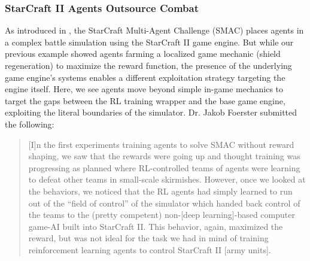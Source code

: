 \subsubsection{StarCraft II Agents Outsource Combat~\citep{samvelyan2019starcraftmultiagentchallenge}}
\label{sec:smachandoff}

As introduced in , the StarCraft Multi-Agent Challenge (SMAC) places agents in a complex battle simulation using the StarCraft II game engine. 
But while our previous example showed agents farming a localized game mechanic (shield regeneration) to maximize the reward function, the presence of the underlying game engine's systems enables a different exploitation strategy targeting the engine itself. Here, we see agents move beyond simple in-game mechanics to target the gaps between the RL training wrapper and the base game engine, exploiting the literal boundaries of the simulator.
Dr. Jakob Foerster submitted the following:

\begin{quote}

[I]n the first experiments training agents to solve SMAC without reward shaping, we saw that the rewards were going up and thought training was progressing as planned where RL-controlled teams of agents were learning to defeat other teams in small-scale skirmishes. 
However, once we looked at the behaviors, we noticed that the RL agents had simply learned to run out of the ``field of control'' of the simulator which handed back control of the teams to the (pretty competent) non-[deep learning]-based computer game-AI built into StarCraft II. 
This behavior, again, maximized the reward, but was not ideal for the task we had in mind of training reinforcement learning agents to control StarCraft II [army units].

\end{quote}
